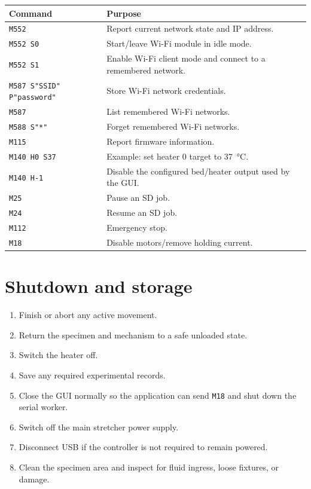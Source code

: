 \documentclass[11pt,a4paper]{article}
\begin{document}
\begin{tabularx}{\textwidth}{p{} X}
\toprule
Command & Purpose \\
\midrule
\texttt{M552} & Report current network state and IP address. \\
\texttt{M552 S0} & Start/leave Wi-Fi module in idle mode. \\
\texttt{M552 S1} & Enable Wi-Fi client mode and connect to a remembered network. \\
\texttt{M587 S"SSID" P"password"} & Store Wi-Fi network credentials. \\
\texttt{M587} & List remembered Wi-Fi networks. \\
\texttt{M588 S"*"} & Forget remembered Wi-Fi networks. \\
\texttt{M115} & Report firmware information. \\
\texttt{M140 H0 S37} & Example: set heater 0 target to \SI{37}{\celsius}. \\
\texttt{M140 H-1} & Disable the configured bed/heater output used by the GUI. \\
\texttt{M25} & Pause an SD job. \\
\texttt{M24} & Resume an SD job. \\
\texttt{M112} & Emergency stop. \\
\texttt{M18} & Disable motors/remove holding current. \\
\bottomrule
\end{tabularx}

\section{Shutdown and storage}

\begin{enumerate}
  \item Finish or abort any active movement.
  \item Return the specimen and mechanism to a safe unloaded state.
  \item Switch the heater off.
  \item Save any required experimental records.
  \item Close the GUI normally so the application can send \texttt{M18} and shut down the serial worker.
  \item Switch off the main stretcher power supply.
  \item Disconnect USB if the controller is not required to remain powered.
  \item Clean the specimen area and inspect for fluid ingress, loose fixtures, or damage.
\end{enumerate}
\end{document}
